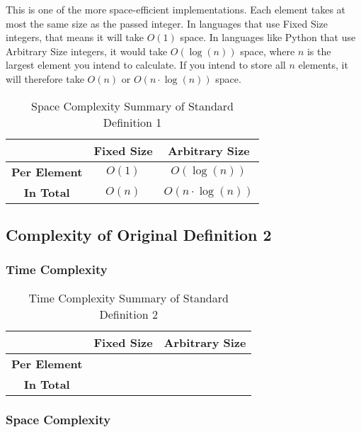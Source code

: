 \documentclass[conference]{IEEEtran}
\begin{document}
This is one of the more space-efficient implementations. Each element takes at most the same size as the passed integer. In languages that use Fixed Size integers, that means it will take $O(1)$ space. In languages like Python that use Arbitrary Size integers, it would take $O(\log(n))$ space, where $n$ is the largest element you intend to calculate. If you intend to store all $n$ elements, it will therefore take $O(n)$ or $O(n \cdot \log(n))$ space.

\begin{table}[H]
    \centering
    \caption{Space Complexity Summary of Standard Definition 1}
    \begin{tabular}{|c|c|c|}
        \hline
        & \textbf{Fixed Size} & \textbf{Arbitrary Size} \\
        \hline
        \textbf{Per Element} & $O(1)$ & $O(\log(n))$ \\
        \hline
        \textbf{In Total} & $O(n)$ & $O(n \cdot \log(n))$ \\
        \hline
    \end{tabular}
    \label{tab:space_p2_d01}
\end{table}

\subsection{Complexity of Original Definition 2}
\label{ca:p2_d02}

\subsubsection{Time Complexity}

\begin{table}[H]
    \centering
    \caption{Time Complexity Summary of Standard Definition 2}
    \begin{tabular}{|c|c|c|}
        \hline
        & \textbf{Fixed Size} & \textbf{Arbitrary Size} \\
        \hline
        \textbf{Per Element} &  &  \\
        \hline
        \textbf{In Total} &  &  \\
        \hline
    \end{tabular}
    \label{tab:time_p2_d02}
\end{table}

\subsubsection{Space Complexity}
\end{document}
